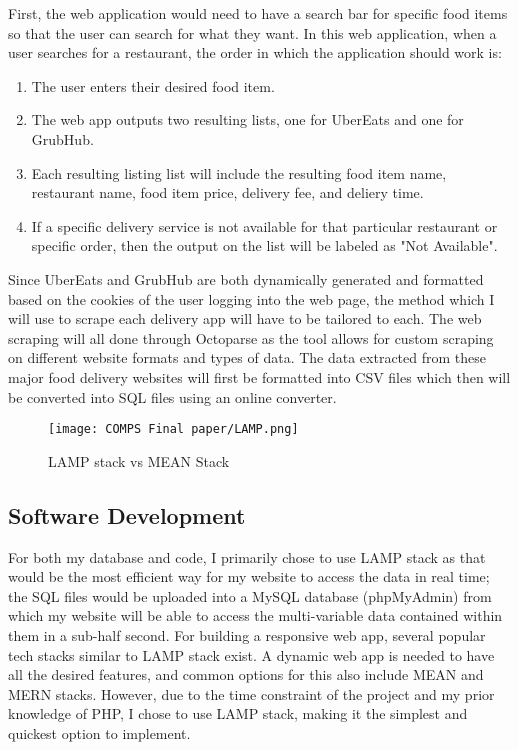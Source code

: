 \documentclass[10pt,twocolumn]{article}
\begin{document}
First, the web application would need to have a search bar for specific food items so that the user can search for what they want. In this web application, when a user searches for a restaurant, the order in which the application should work is:

\begin{enumerate}[label=(\Alph*)]
\item The user enters their desired food item.
\item The web app outputs two resulting lists, one for UberEats and one for GrubHub.
\item Each resulting listing list will include the resulting food item name, restaurant name, food item price, delivery fee, and deliery time.
\item If a specific delivery service is not available for that particular restaurant or specific order, then the output on the list will be labeled as "Not Available".
\end{enumerate}

Since UberEats and GrubHub are both dynamically generated and formatted based on the cookies of the user logging into the web page, the method which I will use to scrape each delivery app will have to be tailored to each. The web scraping will all done through Octoparse as the tool allows for custom scraping on different website formats and types of data. The data extracted from these major food delivery websites will first be formatted into CSV files which then will be converted into SQL files using an online converter. 

\begin{figure}
    \centering
    \texttt{[image: COMPS Final paper/LAMP.png]}
    \caption{
        LAMP stack vs MEAN Stack
    }
    \label{fig:second-page-3}
\end{figure}

\subsection{Software Development}

For both my database and code, I primarily chose to use LAMP stack as that would be the most efficient way for my website to access the data in real time; the SQL files would be uploaded into a MySQL database (phpMyAdmin) from which my website will be able to access the multi-variable data contained within them in a sub-half second. For building a responsive web app, several popular tech stacks similar to LAMP stack exist. A dynamic web app is needed to have all the desired features, and common options for this also include MEAN and MERN stacks. However, due to the time constraint of the project and my prior knowledge of PHP, I chose to use LAMP stack, making it the simplest and quickest option to implement.
\end{document}
